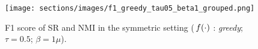 \begin{figure}[htpb]
    \centering
    \texttt{[image: sections/images/f1\_greedy\_tau05\_beta1\_grouped.png]}
    \caption{F1 score of SR and NMI in the symmetric setting (\,$f(\cdot)$ : \textit{greedy}; $\tau=0.5$; $\beta=1\mu$).}
    \label{fig:f1-symmetric-greedy}
\end{figure}




